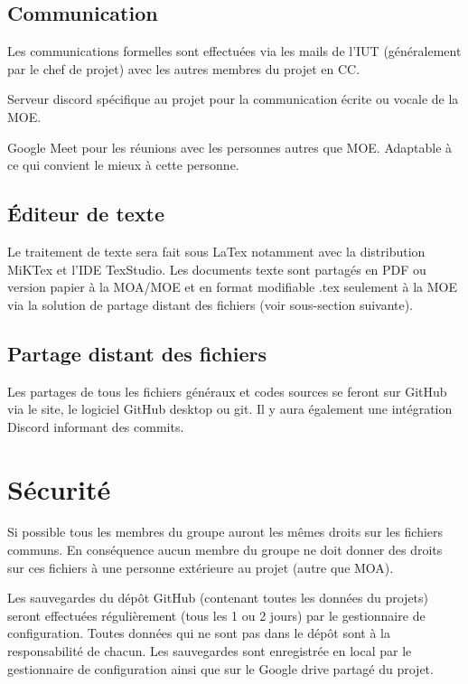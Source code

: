 \documentclass[11pt,a4paper,titlepage,openright]{report}
\begin{document}
        \subsection{Communication}
        \par Les communications formelles sont effectuées via les mails de l’IUT (généralement par le chef
        de projet) avec les autres membres du projet en CC.

        \par Serveur discord spécifique au projet pour la communication écrite ou vocale de la MOE.
        \par Google Meet pour les réunions avec les personnes autres que MOE. Adaptable à ce qui
        convient le mieux à cette personne.
        
        \subsection{Éditeur de texte}
        Le traitement de texte sera fait sous LaTex notamment avec la distribution MiKTex et l'IDE TexStudio. Les documents texte sont partagés en PDF ou version papier à la MOA/MOE  et en format modifiable .tex seulement à la MOE via la solution de partage distant des fichiers (voir sous-section suivante).
        
        \subsection{Partage distant des fichiers}
        Les partages de tous les fichiers généraux et codes sources se feront sur GitHub via le site, le logiciel GitHub desktop ou git. Il y aura également une intégration Discord informant des commits.
        
    \section{Sécurité}
    \par Si possible tous les membres du groupe auront les mêmes droits sur les fichiers communs.
    En conséquence aucun membre du groupe ne doit donner des droits sur ces fichiers à une
    personne extérieure au projet (autre que MOA).
    \par Les sauvegardes du dépôt GitHub (contenant toutes les données du projets) seront effectuées
    régulièrement (tous les 1 ou 2 jours) par le gestionnaire de configuration. Toutes données qui ne
    sont pas dans le dépôt sont à la responsabilité de chacun.
    Les sauvegardes sont enregistrée en local par le gestionnaire de configuration ainsi que sur le Google drive partagé du projet.



    \appendix
\end{document}
